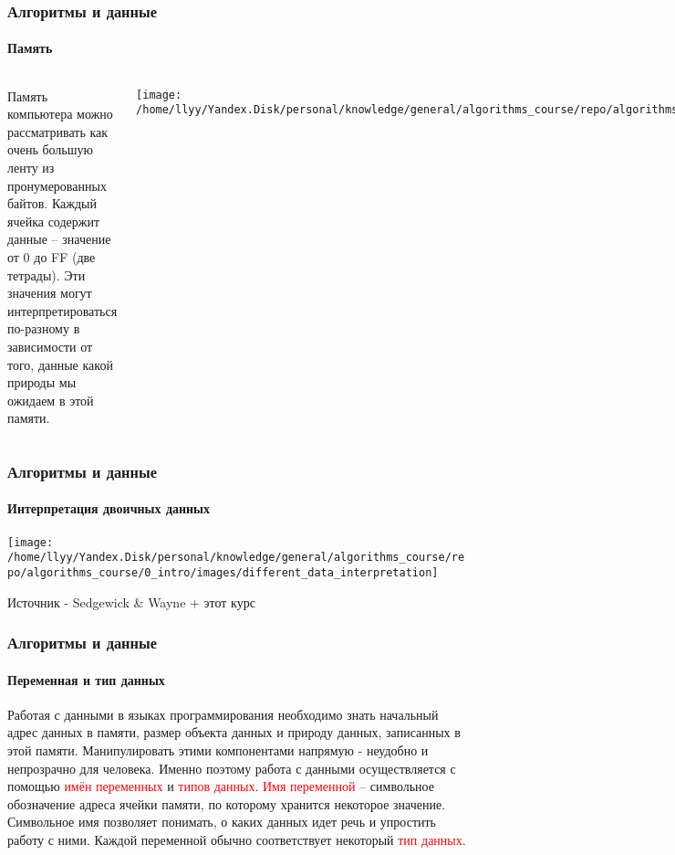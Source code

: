\documentclass[aspectratio=169]{beamer}
\begin{document}
\begin{frame}
\frametitle{Алгоритмы и данные}
\framesubtitle{Память}
\justifying
\begin{block}{}
\begin{columns}[]
\column{\dimexpr\linewidth-50mm}
\justifying
\normalsize

Память компьютера можно рассматривать как очень большую ленту из пронумерованных байтов. Каждый ячейка содержит данные – значение от 0 до FF (две тетрады). \newline\newline Эти значения могут интерпретироваться по-разному в зависимости от того, данные какой природы мы ожидаем в этой памяти.

\centering

\column{50mm}

\texttt{[image: /home/llyy/Yandex.Disk/personal/knowledge/general/algorithms\_course/repo/algorithms\_course/0\_intro/images/memory\_example]}
\centering

\end{columns}
\end{block}
\end{frame}

\begin{frame}
\frametitle{Алгоритмы и данные}
\framesubtitle{Интерпретация двоичных данных}
\justifying
\small
\centering
\texttt{[image: /home/llyy/Yandex.Disk/personal/knowledge/general/algorithms\_course/repo/algorithms\_course/0\_intro/images/different\_data\_interpretation]}

\scriptsize Источник - Sedgewick \& Wayne + этот курс

\end{frame}

\begin{frame}
\frametitle{Алгоритмы и данные}
\framesubtitle{Переменная и тип данных}
\justifying
Работая с данными в языках программирования необходимо знать начальный адрес данных в памяти, размер объекта данных и природу данных, записанных в этой памяти. \newline\newline Манипулировать этими компонентами напрямую - неудобно и непрозрачно для человека. Именно поэтому работа с данными осуществляется с помощью \textcolor{red}{имён переменных} и \textcolor{red}{типов данных}.\newline\newline
\textcolor{red}{Имя переменной} – символьное обозначение адреса ячейки памяти, по которому хранится некоторое значение. Символьное имя позволяет понимать, о каких данных идет речь и упростить работу с ними.\newline\newline
Каждой переменной обычно соответствует некоторый \textcolor{red}{тип данных}.
\end{frame}
\end{document}
